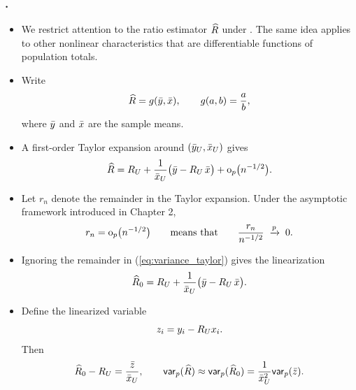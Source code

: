 \documentclass{my_eth_beamer}
\numberwithin{equation}{section}
\begin{document}
\begin{frame}
    \frametitle{\insertsectionnumber.\insertsubsectionnumber~\insertsubsection}
    \begin{itemize}
    \setlength{\itemsep}{12pt}
        \item We restrict attention to the ratio estimator $\widehat{R}$ under
            \SRS. The same idea applies to other nonlinear characteristics
            that are differentiable functions of population totals.
        \item Write
            \begin{equation*}
                \widehat{R} = g(\bar{y},\bar{x}), \qquad g(a,b)=\frac{a}{b},
            \end{equation*}
            where $\bar{y}$ and $\bar{x}$ are the sample means.
        \item A first-order \alert{Taylor expansion} around
            $(\bar{y}_U, \bar{x}_U)$ gives
            \begin{equation}\label{eq:variance_taylor}
                \widehat{R} = R_U + \frac{1}{\bar{x}_U} \big(\bar{y} - R_U\, \bar{x}\big)
                + \mathrm{o}_p\big(n^{-1/2}\big).
            \end{equation}
    \end{itemize}
\end{frame}

\begin{frame}
    \begin{itemize}
    \setlength{\itemsep}{9pt}
        \item Let $r_n$ denote the remainder in the Taylor expansion. Under the
            asymptotic framework introduced in Chapter 2,
            \begin{equation*}
                r_n = \mathrm{o}_p\big(n^{-1/2}\big)
                \qquad \text{means that} \qquad
                \frac{r_n}{n^{-1/2}} \; \xrightarrow{p} \; 0.
            \end{equation*}
        \item Ignoring the remainder in (\ref{eq:variance_taylor}) gives the
            \alert{linearization}
            \begin{equation*}
                \widehat{R}_0 = R_U + \frac{1}{\bar{x}_U} \big(\bar{y}-R_U\,\bar{x}\big).
            \end{equation*}
        \item Define the \alert{linearized variable}
            \begin{equation*}
                z_i = y_i - R_U x_i.
            \end{equation*}
            Then
            \begin{equation*}
                \widehat{R}_0 - R_U = \frac{\bar z}{\bar{x}_U},
                \qquad
                \mathsf{var}_p(\widehat{R}) \approx \mathsf{var}_p(\widehat{R}_0) =
                \frac{1}{\bar{x}_U^2}\mathsf{var}_p(\bar z).
            \end{equation*}
    \end{itemize}
\end{frame}
\end{document}
